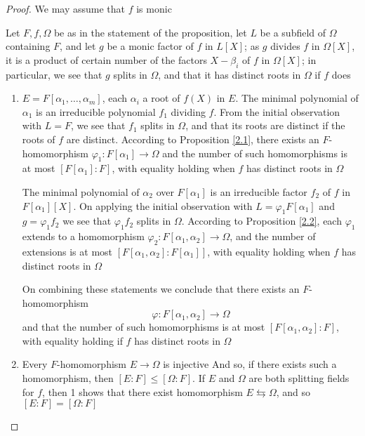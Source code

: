 \documentclass[11pt]{article}
\begin{document}
\begin{proof}
We may assume that \(f\) is monic

Let \(F,f,\Omega\) be as in the statement of the proposition, let \(L\) be a subfield of \(\Omega\)
containing \(F\), and let \(g\) be a monic factor of \(f\) in \(L[X]\); as \(g\) divides \(f\)
in \(\Omega[X]\), it is a product of certain number of the factors \(X-\beta_i\) of \(f\) in \(\Omega[X]\); in
particular, we see that \(g\) splits in \(\Omega\), and that it has distinct roots in \(\Omega\) if \(f\) does

\begin{enumerate}
\item \(E=F[\alpha_1,\dots,\alpha_m]\), each \(\alpha_i\) a root of \(f(X)\) in \(E\). The minimal polynomial of \(\alpha_1\)
is an irreducible polynomial \(f_1\) dividing \(f\). From the initial observation
with \(L=F\), we see that \(f_1\) splits in \(\Omega\), and that its roots are distinct if the roots
of \(f\) are distinct. According to Proposition \ref{2.1}, there exists
an \(F\)-homomorphism \(\varphi_1:F[\alpha_1]\to\Omega\) and the number of such homomorphisms is at
most \([F[\alpha_1]:F]\), with equality holding when \(f\) has distinct roots in \(\Omega\)

The minimal polynomial of \(\alpha_2\) over \(F[\alpha_1]\) is an irreducible factor \(f_2\) of \(f\)
in \(F[\alpha_1][X]\). On applying the initial observation with \(L=\varphi_1F[\alpha_1]\) and \(g=\varphi_1f_2\) we see
that \(\varphi_1f_2\) splits in \(\Omega\). According to Proposition \ref{2.2}, each \(\varphi_1\) extends to a
homomorphism \(\varphi_2:F[\alpha_1,\alpha_2]\to\Omega\), and the number of extensions is at most \([F[\alpha_1,\alpha_2]:F[\alpha_1]]\),
with equality holding when \(f\) has distinct roots in \(\Omega\)

On combining these statements we conclude that there exists an \(F\)-homomorphism
\begin{equation*}
\varphi:F[\alpha_1,\alpha_2]\to\Omega
\end{equation*}
and that the number of such homomorphisms is at most \([F[\alpha_1,\alpha_2]:F]\), with equality holding
if \(f\) has distinct roots in \(\Omega\)

\item Every \(F\)-homomorphism \(E\to\Omega\) is injective
And so, if there exists such a homomorphism,
then \([E:F]\le[\Omega:F]\). If \(E\) and \(\Omega\) are both splitting fields for \(f\), then 1 shows that
there exist homomorphism \(E\leftrightarrows\Omega\), and so \([E:F]=[\Omega:F]\)
\end{enumerate}
\end{proof}
\end{document}
